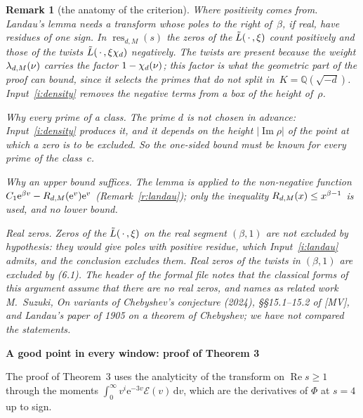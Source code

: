 \documentclass[11pt,a4paper]{article}
\newcommand{\Q}{\mathbb{Q}}
\newcommand{\sect}[2]{\refstepcounter{section}\label{#2}\par\addvspace{19pt plus 4pt minus 2pt}\Needspace{7\baselineskip}%
  \noindent\llap{{\fontsize{13.2}{16}\selectfont\bfseries\color{inkfaint}\thesection}\hspace{9pt}}%
  {\fontsize{13.2}{16}\selectfont\bfseries\color{ink}#1}\par\nopagebreak\vspace{-1pt}}
\theoremstyle{plainx}
\theoremstyle{uprightx}
\newtheorem{remark}[theorem]{Remark}
\newcommand{\ee}{\mathrm{e}}
\newcommand{\dd}{\mathrm{d}}
\newcommand{\re}{\operatorname{Re}}
\newcommand{\im}{\operatorname{Im}}
\newcommand{\res}[3]{\operatorname{res}_{#1,#2}(#3)}
\newcommand{\cE}{\mathcal{E}}
\begin{document}
\begin{remark}[the anatomy of the criterion]\label{r:anatomy}
\emph{Where positivity comes from.} Landau's lemma needs a transform whose poles to the right of~$\beta$, if real,
have residues of one sign. In $\res{d}{M}{s}$ the zeros of the $\tilde L(\,\cdot\,,\xi)$ count positively and those of the
twists $\tilde L(\,\cdot\,,\xi\chi_{d})$ negatively. The twists are present because the weight
$\lambda_{d,M}(\nu)$ carries the factor $1-\chi_{d}(\nu)$; this factor is what the geometric part of the proof
can bound, since it selects the primes that do not split in~$K=\Q(\sqrt{-d})$. Input~\ref{i:density} removes the
negative terms from a box of the height of~$\rho$.

\emph{Why every prime of a class.} The prime $d$ is not chosen in advance: Input~\ref{i:density} produces it, and
it depends on the height $|\im\rho|$ of the point at which a zero is to be excluded. So the one-sided bound must be
known for every prime of the class~$c$.

\emph{Why an upper bound suffices.} The lemma is applied to the non-negative function
$C_1\ee^{\beta v}-\primeError{d}{M}{\ee^{v}}\ee^{v}$ (Remark~\ref{r:landau}); only the inequality
$R_{d,M}(x)\le x^{\beta-1}$ is used, and no lower bound.

\emph{Real zeros.} Zeros of the $\tilde L(\,\cdot\,,\xi)$ on the real segment $(\beta,1)$ are not excluded by hypothesis: they
would give poles with positive residue, which Input~\ref{i:landau} admits, and the conclusion excludes them. Real
zeros of the twists in $(\beta,1)$ are excluded by (6.1). The header of the formal file notes that the classical
forms of this argument assume that there are no real zeros, and names as related work M.~Suzuki, \emph{On variants
of Chebyshev's conjecture} (2024), §§15.1--15.2 of [MV], and Landau's paper of 1905 on a theorem of Chebyshev; we
have not compared the statements.
\end{remark}

\sect{A good point in every window: proof of Theorem 3}{s:window}
The proof of Theorem~3 uses the analyticity of the transform on $\re s\ge1$ through the moments
$\int_0^\infty v^{i}\ee^{-3v}\cE(v)\,\dd v$, which are the derivatives of $\Phi$ at $s=4$ up to sign.
\end{document}
